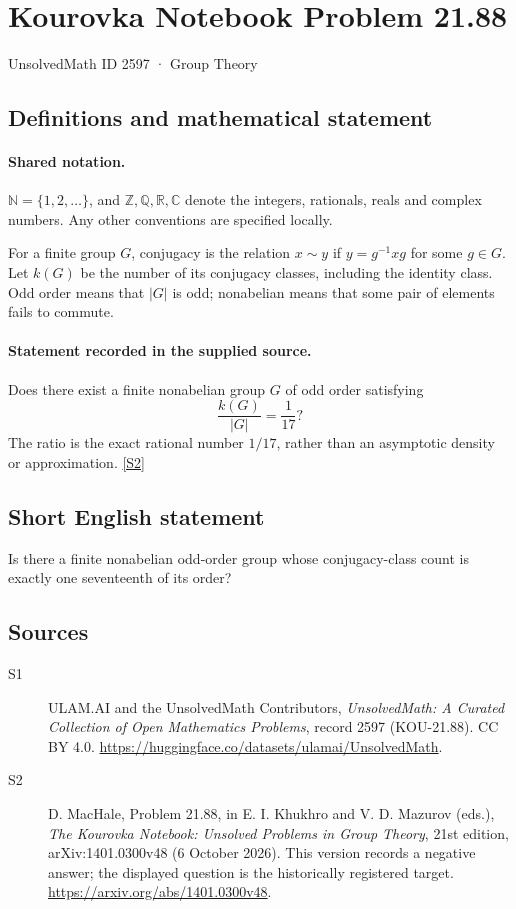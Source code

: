 \documentclass[11pt]{article}
\newcommand{\sref}[2]{\hyperlink{source:#1:#2}{[S#2]}}
\begin{document}
\setcounter{section}{2596}
\section{Kourovka Notebook Problem 21.88}\label{2597}
{\small\sffamily UnsolvedMath ID 2597 · Group Theory}
\subsection{Definitions and mathematical statement}

\paragraph{Shared notation.}$\mathbb N=\{1,2,\ldots\}$, and $\mathbb Z,\mathbb Q,\mathbb R,\mathbb C$ denote the integers, rationals, reals and complex numbers. Any other conventions are specified locally.


For a finite group $G$, conjugacy is the relation $x\sim y$ if $y=g^{-1}xg$ for some $g\in G$. Let $k(G)$ be the number of its conjugacy classes, including the identity class. Odd order means that $|G|$ is odd; nonabelian means that some pair of elements fails to commute.
\paragraph{Statement recorded in the supplied source.}
Does there exist a finite nonabelian group $G$ of odd order satisfying
\[
 \frac{k(G)}{|G|}=\frac1{17}?
\]
The ratio is the exact rational number $1/17$, rather than an asymptotic density or approximation. \sref{2597}{2}
\subsection{Short English statement}
Is there a finite nonabelian odd-order group whose conjugacy-class count is exactly one seventeenth of its order?
\subsection{Sources}
\begin{description}
\item[\hypertarget{source:2597:1}{S1}] ULAM.AI and the UnsolvedMath Contributors, \emph{UnsolvedMath: A Curated Collection of Open Mathematics Problems}, record 2597 (KOU-21.88). CC BY 4.0. \url{https://huggingface.co/datasets/ulamai/UnsolvedMath}.
\item[\hypertarget{source:2597:2}{S2}] D. MacHale, Problem 21.88, in E. I. Khukhro and V. D. Mazurov (eds.), \emph{The Kourovka Notebook: Unsolved Problems in Group Theory}, 21st edition, arXiv:1401.0300v48 (6 October 2026). This version records a negative answer; the displayed question is the historically registered target. \url{https://arxiv.org/abs/1401.0300v48}.
\end{description}
\label{end:2597}
\end{document}
